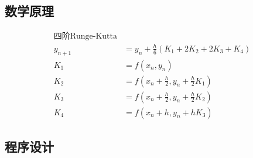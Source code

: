 \documentclass{article}
\begin{document}
\subsection{数学原理}
\begin{align}
    \text{四阶Runge-Kutta} & \nonumber \\
    y_{n+1} & = y_n + \frac{h}{6}(K_1+2K_2+2K_3+K_4) \\
    K_1 & = f(x_n, y_n) \\
    K_2 & = f(x_n+\frac{h}{2}, y_n+\frac{h}{2}K_1) \\
    K_3 & = f(x_n+\frac{h}{2}, y_n+\frac{h}{2}K_2) \\
    K_4 & = f(x_n+h, y_n+hK_3)
    \end{align}

\subsection{程序设计}

\end{document}
